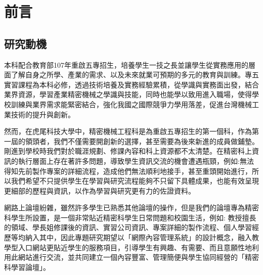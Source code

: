 \setcounter{chapter}{0}
\chapter{前言}
\setcounter{page}{1}  %
\renewcommand{\baselinestretch}{10} %
\section{研究動機}
\par
\renewcommand{\baselinestretch}{2} %
\twelve 本科配合教育部107年重啟五專招生，培養學生一技之長並讓學生從實務應用的層面了解自身之所學、產業的需求、以及未來就業可預期的多元的教育與訓練。專五實習課程為本科必修，透過技術培養及實務經驗累積，從學識與實務面出發，結合業界資源，學習產業精密機械之學識與技能，同時也能學以致用進入職場，使得學校訓練與業界需求能緊密結合，強化我國之國際競爭力學用落差，促進台灣機械工業技術的提升與創新。\\
\par
\renewcommand{\baselinestretch}{1} %
\twelve 然而，在虎尾科技大學中，精密機械工程科是為重啟五專招生的第一個科，作為第一屆的領頭者，我們不僅需要開創新的選擇，甚至需要為後來新進的成員做鋪墊。剛進到學校時我們對於職涯規劃、修課內容和科上資源都不太清楚。在精密科上資訊的執行層面上存在著許多問題，導致學生資訊交流的機會遭遇瓶頸，例如:無法得知先前製作專案的詳細流程，造成他們無法順利地接手，甚至重頭開始進行，所以我們希望不只提供學生在學習與研究流程能夠不只留下具體成果，也能有效呈現更細部的歷程與資訊，以作為學習與研究更有力的佐證資料。\\
\par
\renewcommand{\baselinestretch}{1} %
\twelve 網路上論壇紛雜，雖然許多學生已熟悉其他論壇的操作，但是我們的論壇專為精密科學生所設置，是一個非常貼近精密科學生日常問題和校園生活，例如: 教授擅長的領域、學長姐修課後的資訊、實習公司資訊、專案詳細的製作流程、個人學習經歷等均納入其中，因此專題研究期望以「網際內容管理系統」的設計概念，融入教學型入口網站更貼近學生的服務項目，引導學生有興趣、有需要、而且意願性地利用此網站進行交流，並共同建立一個內容豐富、管理簡便與學生協同經營的「精密科學習論壇」。
\par

\renewcommand{\baselinestretch}{20} %
